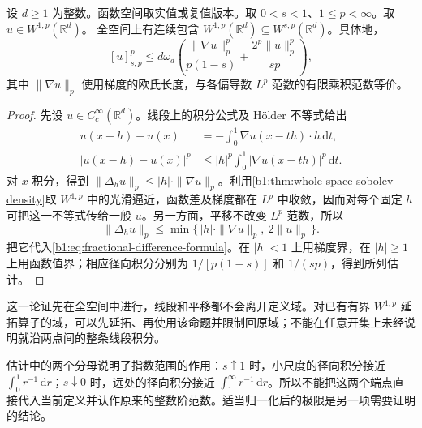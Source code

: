 \begin{proposition}\label{b1:prop:integer-to-fractional-sobolev}
设 \(d\geq1\) 为整数。函数空间取实值或复值版本。取 \(0<s<1\)、\(1\leq p<\infty\)。取 \(u\in W^{1,p}(\mathbb R^d)\)。
全空间上有连续包含 \(W^{1,p}(\mathbb R^d)\subseteq W^{s,p}(\mathbb R^d)\)。具体地，
\begin{equation}\label{b1:eq:integer-fractional-estimate}
 [u]_{s,p}^p
 \leq d\omega_d\left(
    \frac{\|\nabla u\|_p^p}{p(1-s)}
    +\frac{2^p\|u\|_p^p}{sp}\right),
\end{equation}
其中 \(\|\nabla u\|_p\) 使用梯度的欧氏长度，与各偏导数 \(L^p\) 范数的有限乘积范数等价。
\end{proposition}
\begin{proof}
先设 \(u\in C_c^\infty(\mathbb R^d)\)。线段上的积分公式及 Hölder 不等式给出
\[
 \begin{aligned}
 u(x-h)-u(x)&=-\int_0^1\nabla u(x-th)\cdot h\,\mathrm dt,\\
 |u(x-h)-u(x)|^p
 &\leq |h|^p\int_0^1|\nabla u(x-th)|^p\,\mathrm dt.
 \end{aligned}
\]
对 \(x\) 积分，得到 \(\|\Delta_hu\|_p\leq|h|\cdot\|\nabla u\|_p\)。利用\cref{b1:thm:whole-space-sobolev-density}取 \(W^{1,p}\) 中的光滑逼近，函数差及梯度都在 \(L^p\) 中收敛，因而对每个固定 \(h\) 可把这一不等式传给一般 \(u\)。另一方面，平移不改变 \(L^p\) 范数，所以
\[
 \|\Delta_hu\|_p
 \leq\min\{\,|h|\cdot\|\nabla u\|_p,\ 2\|u\|_p\,\}.
\]
把它代入\eqref{b1:eq:fractional-difference-formula}。在 \(|h|<1\) 上用梯度界，在 \(|h|\geq1\) 上用函数值界；相应径向积分分别为 \(1/[p(1-s)]\) 和 \(1/(sp)\)，得到所列估计。
\end{proof}

这一论证先在全空间中进行，线段和平移都不会离开定义域。对已有有界 \(W^{1,p}\) 延拓算子的域，可以先延拓、再使用该命题并限制回原域；不能在任意开集上未经说明就沿两点间的整条线段积分。

\ProseParagraphBreak

估计中的两个分母说明了指数范围的作用：\(s\uparrow1\) 时，小尺度的径向积分接近 \(\int_0^1r^{-1}\,\mathrm dr\)；\(s\downarrow0\) 时，远处的径向积分接近 \(\int_1^\infty r^{-1}\,\mathrm dr\)。所以不能把这两个端点直接代入当前定义并认作原来的整数阶范数。适当归一化后的极限是另一项需要证明的结论。

